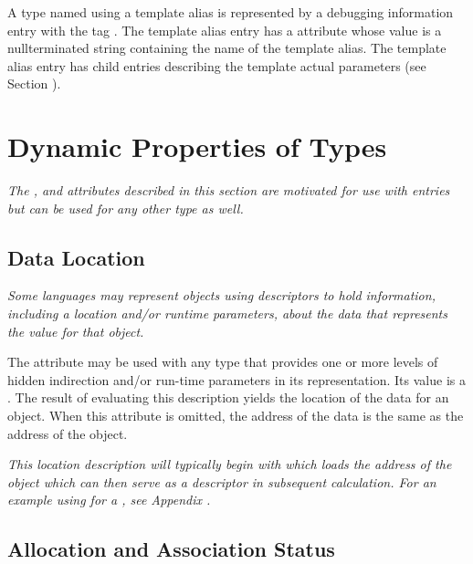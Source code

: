 A type named using a template alias is represented
by a debugging information entry 
with the tag
\DWTAGtemplatealiasTARG. 
The template alias entry has a
\DWATname{} attribute 
whose value is a null\dash terminated string
containing the name of the template alias.
\bbeb 
The template alias entry has child entries describing the template
actual parameters (see Section ).


\section{Dynamic Properties of Types}
\label{chap:dynamicpropertiesoftypes}
\textit{The \DWATdatalocation, \DWATallocated{} and \DWATassociated{}
attributes described in this section are motivated for use with
\DWTAGdynamictype{} entries but can be used for any other type as well.}

\subsection{Data Location}
\label{chap:datalocation}

\textit{Some languages may represent objects using descriptors to hold
information, including a location and/or run\dash time parameters,
about the data that represents the value for that object.}

The\hypertarget{chap:DWATdatalocationindirectiontoactualdata}{}
\DWATdatalocationDEFN{} attribute 
may be used with any type that provides one or more levels of 
hidden indirection
and/or run-time parameters in its representation. Its value
is a . 
The result of evaluating this
description yields the location of the data for an object.
When this attribute is omitted, the address of the data is
the same as the address of the object.

\textit{This location description will typically begin with
\DWOPpushobjectaddress{} 
which loads the address of the
object which can then serve as a descriptor in subsequent
calculation. For an example using 
\DWATdatalocation{} 
for a , see 
Appendix .}

\subsection{Allocation and Association Status}
\label{chap:allocationandassociationstatus}

